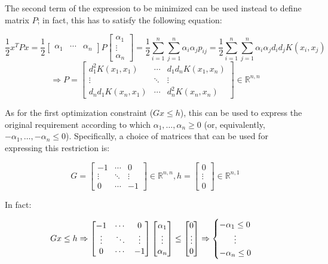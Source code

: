 \documentclass[letterpaper,headings=standardclasses]{scrartcl}
\begin{document}
The second term of the expression to be minimized can be used instead to define matrix $P$; in fact, this has to satisfy the following equation:

$$ \frac{1}{2} x^T P x = \frac{1}{2} \left[ \begin{matrix} \alpha_1 & \cdots & \alpha_n \end{matrix} \right] P \left[ \begin{matrix} \alpha_1 \\ \vdots \\ \alpha_n \end{matrix} \right] = \frac{1}{2} \sum_{i = 1}^n \sum_{j = 1}^n \alpha_i \alpha_j p_{ij} = \frac{1}{2} \sum_{i = 1}^n \sum_{j = 1}^n \alpha_i \alpha_j d_i d_j K(x_i, x_j) $$
$$ \Rightarrow P = \left[ \begin{matrix} d_1^2 K(x_1, x_1) & \cdots & d_1 d_n K(x_1, x_n) \\ \vdots & \ddots & \vdots \\ d_n d_1 K(x_n, x_1) & \cdots & d_n^2 K(x_n, x_n) \end{matrix} \right] \in \mathbb{R}^{n,n} $$

As for the first optimization constraint ($Gx \le h$), this can be used to express the original requirement according to which $\alpha_1, \dots, \alpha_n \ge 0$ (or, equivalently, $-\alpha_1, \dots, -\alpha_n \le 0$). Specifically, a choice of matrices that can be used for expressing this restriction is:

$$ G = \left[ \begin{matrix} -1 & \cdots & 0 \\ \vdots & \ddots & \vdots \\ 0 & \cdots & -1 \end{matrix} \right] \in \mathbb{R}^{n,n}, h = \left[ \begin{matrix} 0 \\ \vdots \\ 0 \end{matrix} \right] \in \mathbb{R}^{n,1} $$

In fact:

$$ Gx \le h \Rightarrow \left[ \begin{matrix} -1 & \cdots & 0 \\ \vdots & \ddots & \vdots \\ 0 & \cdots & -1 \end{matrix} \right] \left[ \begin{matrix} \alpha_1 \\ \vdots \\ \alpha_n \end{matrix} \right] \le \left[ \begin{matrix} 0 \\ \vdots \\ 0 \end{matrix} \right] \Rightarrow \begin{cases} -\alpha_1 \le 0 \\ \hfil \vdots \\ -\alpha_n \le 0 \end{cases} $$
\end{document}
